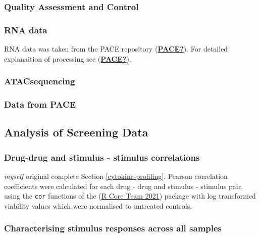 \documentclass[11pt, a4paper, twosided]{book}
\begin{document}
\hypertarget{quality-assessment-and-control}{%
\subsubsection{Quality Assessment and Control}\label{quality-assessment-and-control}}

\hypertarget{rna-data}{%
\subsubsection{RNA data}\label{rna-data}}

RNA data was taken from the PACE repository (\protect\hyperlink{ref-PACE}{\textbf{PACE?}}). For detailed explanaition of processing see (\protect\hyperlink{ref-PACE}{\textbf{PACE?}}).

\hypertarget{atacsequencing-1}{%
\subsubsection{ATACsequencing}\label{atacsequencing-1}}

\hypertarget{data-from-pace}{%
\subsubsection{Data from PACE}\label{data-from-pace}}

\hypertarget{analysis-of-screening-data}{%
\subsection{Analysis of Screening Data}\label{analysis-of-screening-data}}

\hypertarget{correlations}{%
\subsubsection{Drug-drug and stimulus - stimulus correlations}\label{correlations}}

\emph{myself} original complete
Section \ref{cytokine-profiling}. Pearson correlation coefficients were calculated for each drug - drug and stimulus - stimulus pair, using the \texttt{cor} functions of the (\protect\hyperlink{ref-R-base}{R Core Team 2021}) package with log transformed viability values which were normalised to untreated controls.

\hypertarget{stimulus-heatmap-method}{%
\subsubsection{Characterising stimulus responses across all samples}\label{stimulus-heatmap-method}}
\end{document}
